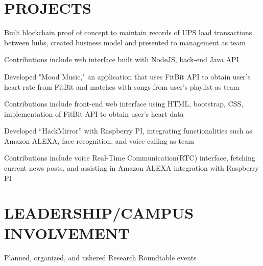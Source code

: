 \documentclass[]{deedy-resume-openfont}
\begin{document}
\begin{minipage}[t]{0.67\textwidth}

\section {PROJECTS}

\begin{tightemize}
\item Built blockchain proof of concept to maintain records of UPS load transactions between hubs, created business model and presented to management as team
\item Contributions include web interface built with NodeJS, back-end Java API
\end{tightemize}
\sectionsep

\descript{}
\begin{tightemize}
\item Developed "Mood Music," an application that uses FitBit API to obtain user's heart rate from FitBit and matches with songs from user's playlist as team
\item Contributions include front-end web interface using HTML, bootstrap, CSS, implementation of FitBit API to obtain user's heart data
\end{tightemize}
\sectionsep

\begin{tightemize}
\item Developed “HackMirror” with Raspberry PI, integrating functionalities such as Amazon ALEXA, face recognition, and voice calling as team
\item Contributions include voice Real-Time Communication(RTC) interface, fetching current news posts, and assisting in Amazon ALEXA integration with Raspberry PI
\end{tightemize}
\sectionsep

\section{LEADERSHIP/CAMPUS INVOLVEMENT} 

\begin{tightemize}
\item Planned, organized, and ushered Research Roundtable events
\end{tightemize}

\sectionsep

\sectionsep

\end{minipage} 
\end{document}
